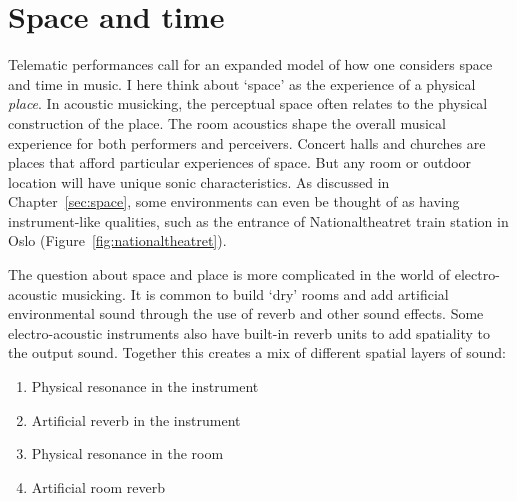 



\section{Space and time}

Telematic performances call for an expanded model of how one considers space and time in music. I here think about `space' as the experience of a physical \emph{place}. In acoustic musicking, the perceptual space often relates to the physical construction of the place. The room acoustics shape the overall musical experience for both performers and perceivers. Concert halls and churches are places that afford particular experiences of space. But any room or outdoor location will have unique sonic characteristics. As discussed in Chapter~\ref{sec:space}, some environments can even be thought of as having instrument-like qualities, such as the entrance of Nationaltheatret train station in Oslo (Figure~\ref{fig:nationaltheatret}).

The question about space and place is more complicated in the world of electro-acoustic musicking. It is common to build `dry' rooms and add artificial environmental sound through the use of reverb and other sound effects. Some electro-acoustic instruments also have built-in reverb units to add spatiality to the output sound. Together this creates a mix of different spatial layers of sound:

\begin{enumerate}
	\item Physical resonance in the instrument
	\item Artificial reverb in the instrument
	\item Physical resonance in the room
	\item Artificial room reverb
\end{enumerate}


